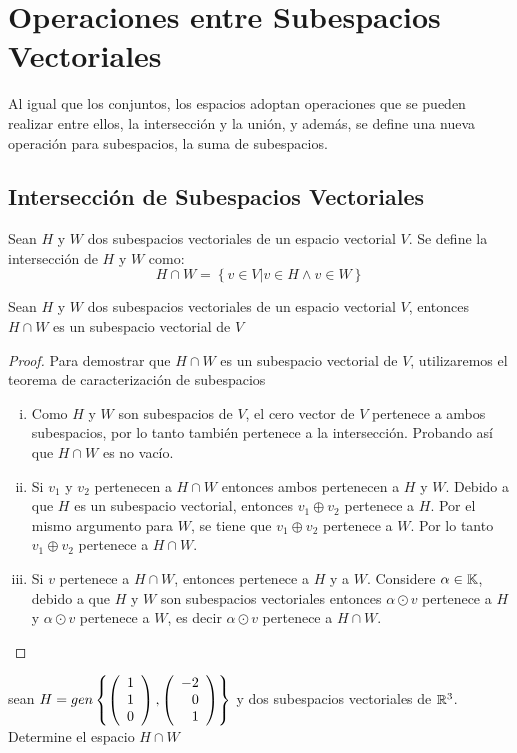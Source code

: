 \chapter{Operaciones entre Subespacios Vectoriales}
Al igual que los conjuntos, los espacios adoptan operaciones que se pueden
realizar entre ellos, la intersección y la unión, y además, se define una nueva
operación para subespacios, la suma de subespacios.
\section{Intersección de Subespacios Vectoriales}
\begin{dfn}
Sean $H$ y $W$ dos subespacios vectoriales de un espacio vectorial $V$. Se define la intersección de $H$ y $W$ como:
$$H \cap W = \left\{ v \in V | v \in H \land v \in W \right\}$$
\end{dfn}

\begin{theorem}
Sean $H$ y $W$ dos subespacios vectoriales de un espacio vectorial $V$, entonces $H \cap W$ es un subespacio vectorial de $V$
\end{theorem}
\begin{proof}
Para demostrar que $H \cap W$ es un subespacio vectorial de $V$, utilizaremos el teorema de caracterización de subespacios
~\\ \begin{enumerate}[i.]
\item Como $H$ y $W$ son subespacios de $V$, el cero vector de $V$ pertenece a ambos subespacios, por lo tanto también pertenece a la intersección. Probando así que $H \cap W$ es no vacío.
\item Si $v_1$ y $v_2$ pertenecen a $H \cap W$ entonces ambos pertenecen a $H$ y $W$. Debido a que $H$ es un subespacio vectorial, entonces $v_1 \oplus v_2$ pertenece a $H$. Por el mismo argumento para $W$, se tiene que $v_1\oplus v_2$ pertenece a $W$. Por lo tanto $v_1\oplus v_2$ pertenece a $H\cap W$.
\item Si $v$ pertenece a  $H \cap W$, entonces  pertenece a $H$ y a $W$.  Considere $\alpha \in \mathbb{K}$,  debido a que $H$ y $W$ son subespacios vectoriales entonces $\alpha \odot v$ pertenece a $H$ y $\alpha \odot v$ pertenece a $W$, es decir $\alpha \odot v$ pertenece a $H \cap W$.  
\end{enumerate}
\end{proof}

\begin{ejemplo}
sean $H = gen \left\{\left( \begin{array}{r} 1\\ 1\\ 0 \end{array} \right) ,\left( \begin{array}{r} -2\\ 0\\ 1 \end{array} \right)  \right\} $ y 
dos subespacios vectoriales de $\mathbb{R}^3$. Determine el espacio $H \cap W$
\end{ejemplo}

